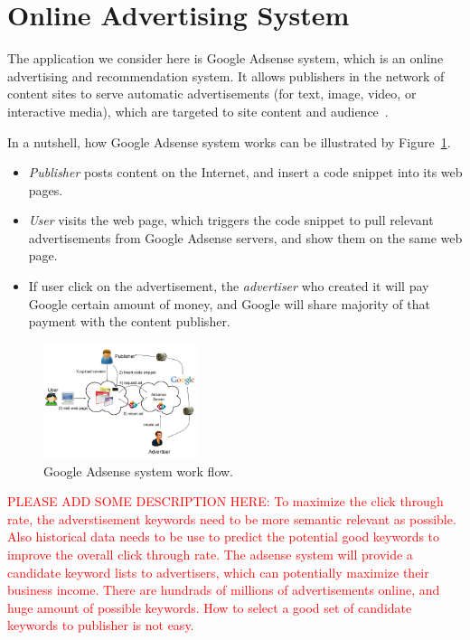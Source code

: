 \section{Online Advertising System}
\label{sec:google}

The application we consider here is Google Adsense system, which is an
online advertising and recommendation system. It allows publishers in
the network of content sites to serve automatic advertisements (for
text, image, video, or interactive media), which are targeted to site
content and audience~\cite{adsense:wiki}.


In a nutshell, how Google Adsense system works can be illustrated by
Figure~\ref{fig:adsense}.
\begin{itemize} \itemsep -2pt
\item {\em Publisher} posts content on the Internet, and insert a code
  snippet into its web pages.
\item {\em User} visits the web page, which triggers the code snippet
  to pull relevant advertisements from Google Adsense servers, and
  show them on the same web page.
\item If user click on the advertisement, the {\em advertiser} who
  created it will pay Google certain amount of money, and Google will
  share majority of that payment with the content publisher.
\end{itemize}

\begin{figure}[!ht]
  \centering
  \includegraphics[width=0.4\textwidth]{figures/adsense.jpg}
  \caption{Google Adsense system work flow.}
  \label{fig:adsense}
\end{figure}

\textcolor{red}{ PLEASE ADD SOME DESCRIPTION HERE: To maximize the
  click through rate, the adverstisement keywords need to be more
  semantic relevant as possible.  Also historical data needs to be use
  to predict the potential good keywords to improve the overall click
  through rate. The adsense system will provide a candidate keyword
  lists to advertisers, which can potentially maximize their business
  income.  There are hundrads of millions of advertisements online,
  and huge amount of possible keywords. How to select a good set of
  candidate keywords to publisher is not easy. }
